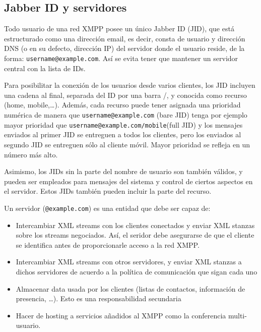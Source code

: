 \documentclass[a4paper, 11pt]{article} %
\begin{document}
  \subsection{Jabber ID y servidores}
    Todo usuario de una red XMPP posee un único Jabber ID (JID), que está estructurado como una dirección email, es decir, 
    consta de usuario y dirección DNS (o en su defecto, dirección IP) del servidor donde el usuario reside, de la forma:
    \texttt{username@example.com}. Así se evita tener que mantener un servidor central con la lista de IDs.
    
    Para posibilitar la conexión de los usuarios desde varios clientes, los JID incluyen una cadena al final, separada
    del ID por una barra /, y conocida como recurso (home, mobile,\ldots). Además, cada recurso puede
    tener asignada una prioridad numérica de manera que \texttt{username@example.com} (bare JID) tenga por ejemplo mayor prioridad que 
    \texttt{username@example.com/mobile}(full JID) y los mensajes enviados al primer JID se entreguen a todos los clientes,
    pero los enviados al segundo JID se entreguen sólo al cliente móvil. Mayor prioridad se refleja en un número más alto.
    
    Asimismo, los JIDs sin la parte del nombre de usuario son también válidos, y pueden ser empleados para mensajes del
    sistema y control de ciertos aspectos en el servidor. Estos JIDs también pueden incluir la parte del recurso.
    
    Un servidor (\texttt{@example.com}) es una entidad que debe ser capaz de:
    \begin{itemize}
     \item Intercambiar XML streams con los clientes conectados y enviar XML stanzas sobre los streams negociados. Así, el
     seridor debe asegurarse de que el cliente se identifica antes de proporcionarle acceso a la red XMPP.
     \item Intercambiar XML streams con otros servidores, y enviar XML stanzas a dichos servidores de acuerdo a la política
     de comunicación que sigan cada uno
     \item Almacenar data usada por los clientes (listas de contactos, información de presencia, \ldots). Esto es una
     responsabilidad secundaria
     \item Hacer de hosting a servicios añadidos al XMPP como la conferencia multi-usuario.
    \end{itemize}
    
\end{document}
